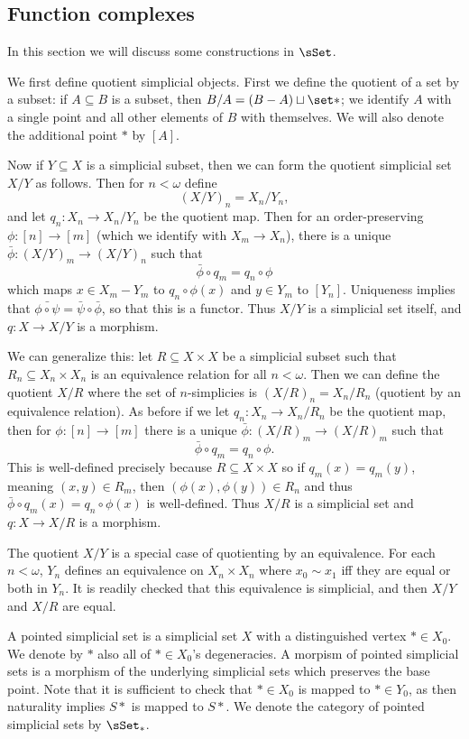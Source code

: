 \subsection{Function complexes}

In this section we will discuss some constructions in $\sSet$.

We first define quotient simplicial objects.
First we define the quotient of a set by a subset: if $A\subseteq B$ is a subset, then $B/A=(B-A)\sqcup\set*$; we identify $A$ with a single point and all other elements
of $B$ with themselves.
We will also denote the additional point $*$ by $[A]$.

Now if $Y\subseteq X$ is a simplicial subset, then we can form the {\emphcolor quotient} simplicial set $X/Y$ as follows.
Then for $n<\omega$ define
$$ (X/Y)_n = X_n/Y_n , $$
and let $q_n\colon X_n\to X_n/Y_n$ be the quotient map.
Then for an order-preserving $\phi\colon[n]\to[m]$ (which we identify with $X_m\to X_n$), there is a unique $\bar\phi\colon(X/Y)_m\to(X/Y)_n$ such that
$$ \bar\phi\circ q_m = q_n\circ\phi $$
which maps $x\in X_m-Y_m$ to $q_n\circ\phi(x)$ and $y\in Y_m$ to $[Y_n]$.
Uniqueness implies that $\bar{\phi\circ\psi}=\bar\psi\circ\bar\phi$, so that this is a functor.
Thus $X/Y$ is a simplicial set itself, and $q\colon X\to X/Y$ is a morphism.

We can generalize this: let $R\subseteq X\times X$ be a simplicial subset such that $R_n\subseteq X_n\times X_n$ is an equivalence relation for all $n<\omega$.
Then we can define the quotient $X/R$ where the set of $n$-simplicies is $(X/R)_n=X_n/R_n$ (quotient by an equivalence relation).
As before if we let $q_n\colon X_n\to X_n/R_n$ be the quotient map, then for $\phi\colon[n]\to[m]$ there is a unique $\bar\phi\colon(X/R)_m\to(X/R)_m$ such that
$$ \bar\phi\circ q_m = q_n\circ\phi . $$
This is well-defined precisely because $R\subseteq X\times X$ so if $q_m(x)=q_m(y)$, meaning $(x,y)\in R_m$, then $(\phi(x),\phi(y))\in R_n$ and thus
$\bar\phi\circ q_m(x)=q_n\circ\phi(x)$ is well-defined.
Thus $X/R$ is a simplicial set and $q\colon X\to X/R$ is a morphism.

The quotient $X/Y$ is a special case of quotienting by an equivalence.
For each $n<\omega$, $Y_n$ defines an equivalence on $X_n\times X_n$ where $x_0\sim x_1$ iff they are equal or both in $Y_n$.
It is readily checked that this equivalence is simplicial, and then $X/Y$ and $X/R$ are equal.

A {\emphcolor pointed simplicial set} is a simplicial set $X$ with a distinguished vertex $*\in X_0$.
We denote by $*$ also all of $*\in X_0$'s degeneracies.
A morpism of pointed simplicial sets is a morphism of the underlying simplicial sets which preserves the base point.
Note that it is sufficient to check that $*\in X_0$ is mapped to $*\in Y_0$, as then naturality implies $S*$ is mapped to $S*$.
We denote the category of pointed simplicial sets by $\sSet_*$.

